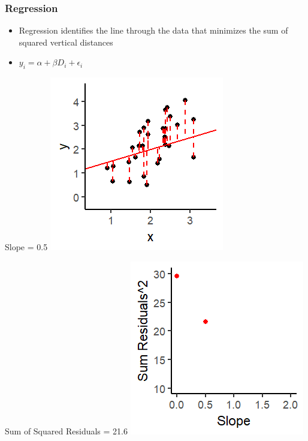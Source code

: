 \documentclass[xcolor=x11names,compress]{beamer}\usepackage[]{graphicx}\usepackage[]{color}
\makeatletter
\def\maxwidth{ %
  \ifdim\Gin@nat@width>\linewidth
    \linewidth
  \else
    \Gin@nat@width
  \fi
}
\newenvironment{knitrout}{}{} %
\renewcommand{\(}{\begin{columns}}
\renewcommand{\)}{\end{columns}}
\newcommand{\<}[1]{\begin{column}{#1}}
\renewcommand{\>}{\end{column}}
\makeatother
\begin{document}
\begin{frame}
\frametitle{Regression}
\begin{itemize}
\item Regression identifies the line through the data that minimizes the sum of squared vertical distances 
\item $y_i = \alpha + \beta D_i + \epsilon_i$
\end{itemize}
\begin{multicols}{2}
Slope = 0.5
\begin{knitrout}
\color{fgcolor}
\includegraphics[width=\maxwidth]{figure/graph_ols2-1} 

\end{knitrout}
\columnbreak
Sum of Squared Residuals = 21.6
\begin{knitrout}
\color{fgcolor}
\includegraphics[width=\maxwidth]{figure/graph_ssr2-1} 

\end{knitrout}
\end{multicols}
\end{frame}
\end{document}

